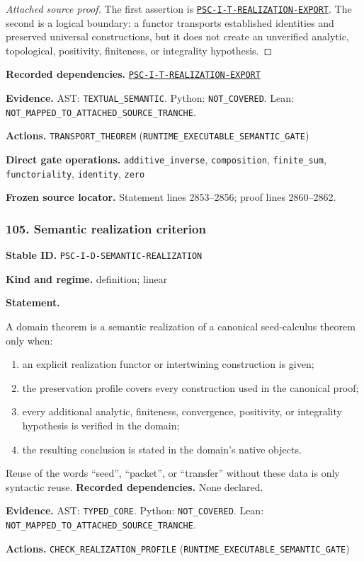 \documentclass[a4paper,11pt]{article}
\newcommand{\field}[2]{\noindent\textbf{#1.} #2\par}
\begin{document}
\begin{proof}[Attached source proof]
The first assertion is \hyperref[rec:PSC-I-T-REALIZATION-EXPORT]{\nolinkurl{PSC-I-T-REALIZATION-EXPORT}}.  The second is a logical boundary: a functor transports established identities and preserved universal constructions, but it does not create an unverified analytic, topological, positivity, finiteness, or integrality hypothesis.
\end{proof}
\field{Recorded dependencies}{\hyperref[rec:PSC-I-T-REALIZATION-EXPORT]{\nolinkurl{PSC-I-T-REALIZATION-EXPORT}}}
\field{Evidence}{AST: \nolinkurl{TEXTUAL_SEMANTIC}. Python: \nolinkurl{NOT_COVERED}. Lean: \nolinkurl{NOT_MAPPED_TO_ATTACHED_SOURCE_TRANCHE}.}
\field{Actions}{\nolinkurl{TRANSPORT_THEOREM} (\nolinkurl{RUNTIME_EXECUTABLE_SEMANTIC_GATE})}
\field{Direct gate operations}{\nolinkurl{additive_inverse}, \nolinkurl{composition}, \nolinkurl{finite_sum}, \nolinkurl{functoriality}, \nolinkurl{identity}, \nolinkurl{zero}}
\field{Frozen source locator}{Statement lines 2853--2856; proof lines 2860--2862.}
\subsubsection*{105. Semantic realization criterion}
\label{rec:PSC-I-D-SEMANTIC-REALIZATION}
\field{Stable ID}{\nolinkurl{PSC-I-D-SEMANTIC-REALIZATION}}
\field{Kind and regime}{definition; linear}
\textbf{Statement.}\par
A domain theorem is a semantic realization of a canonical seed-calculus theorem only when:
\begin{enumerate}[label=(\roman*)]
\item an explicit realization functor or intertwining construction is given;
\item the preservation profile covers every construction used in the canonical proof;
\item every additional analytic, finiteness, convergence, positivity, or integrality hypothesis is verified in the domain;
\item the resulting conclusion is stated in the domain's native objects.
\end{enumerate}
Reuse of the words ``seed'', ``packet'', or ``transfer'' without these data is only syntactic reuse.
\field{Recorded dependencies}{None declared.}
\field{Evidence}{AST: \nolinkurl{TYPED_CORE}. Python: \nolinkurl{NOT_COVERED}. Lean: \nolinkurl{NOT_MAPPED_TO_ATTACHED_SOURCE_TRANCHE}.}
\field{Actions}{\nolinkurl{CHECK_REALIZATION_PROFILE} (\nolinkurl{RUNTIME_EXECUTABLE_SEMANTIC_GATE})}
\end{document}
